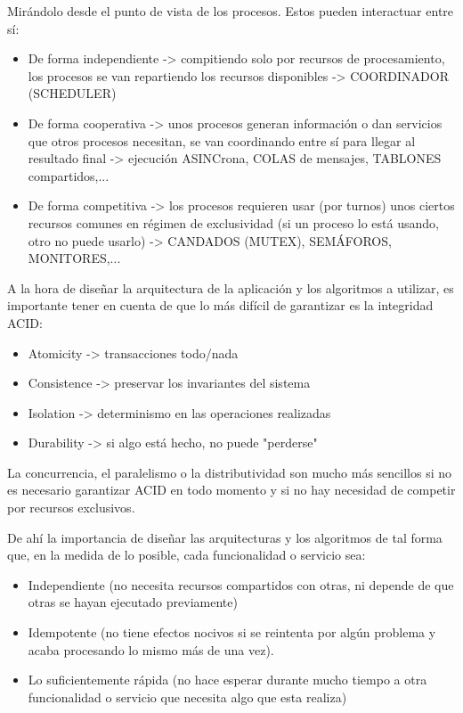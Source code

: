 \documentclass[spanish,12pt,a4paper,final,oneside]{book}
\begin{document}
Mirándolo desde el punto de vista de los procesos. Estos pueden interactuar entre sí:

\begin{itemize}

\item De forma independiente -> compitiendo solo por recursos de procesamiento, los procesos se van repartiendo los recursos disponibles -> COORDINADOR (SCHEDULER)


\item De forma cooperativa -> unos procesos generan información o dan servicios que otros procesos necesitan, se van coordinando entre sí para llegar al resultado final -> ejecución ASINCrona, COLAS de mensajes, TABLONES compartidos,...

\item De forma competitiva -> los procesos requieren usar (por turnos) unos ciertos recursos comunes en régimen de exclusividad (si un proceso lo está usando, otro no puede usarlo) -> CANDADOS (MUTEX), SEMÁFOROS, MONITORES,...

\end{itemize}

A la hora de diseñar la arquitectura de la aplicación y los algoritmos a utilizar, es importante tener en cuenta de que lo más difícil de garantizar es la integridad ACID:

\begin{itemize}
\item Atomicity -> transacciones todo/nada
\item Consistence -> preservar los invariantes del sistema
\item Isolation -> determinismo en las operaciones realizadas
\item Durability -> si algo está hecho, no puede "perderse"
\end{itemize}

La concurrencia, el paralelismo o la distributividad son mucho más sencillos si no es necesario garantizar ACID en todo momento y si no hay necesidad de competir por recursos exclusivos.

De ahí la importancia de diseñar las arquitecturas y los algoritmos de tal forma que, en la medida de lo posible, cada funcionalidad o servicio sea:

\begin{itemize}

\item Independiente (no necesita recursos compartidos con otras, ni depende de que otras se hayan ejecutado previamente) 

\item Idempotente (no tiene efectos nocivos si se reintenta por algún problema y acaba procesando lo mismo más de una vez).

\item Lo suficientemente rápida (no hace esperar durante mucho tiempo a otra funcionalidad o servicio que necesita algo que esta realiza)


\end{itemize}
\end{document}
